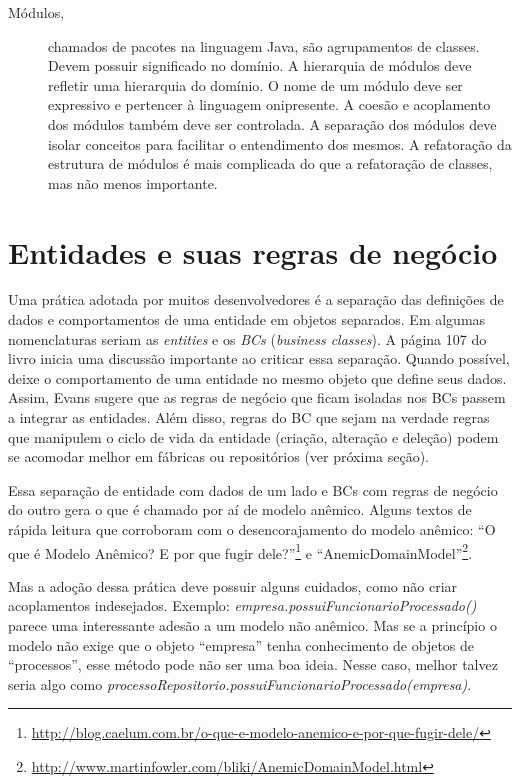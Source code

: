 \documentclass[a4paper, 12pt]{article}
\begin{document}
\begin{description}
\item [Módulos,] chamados de pacotes na linguagem Java, são agrupamentos de classes. Devem possuir significado no domínio. A hierarquia de módulos deve refletir uma hierarquia do domínio. O nome de um módulo deve ser expressivo e pertencer à linguagem onipresente. A coesão e acoplamento dos módulos também deve ser controlada. A separação dos módulos deve isolar conceitos para facilitar o entendimento dos mesmos. A refatoração da estrutura de módulos é mais complicada do que a refatoração de classes, mas não menos importante.

\end{description}

\section{Entidades e suas regras de negócio}

Uma prática adotada por muitos desenvolvedores é a separação das definições de dados e comportamentos de uma entidade em objetos separados. Em algumas nomenclaturas seriam as \emph{entities} e os \emph{BCs} (\emph{business classes}). A página 107 do livro inicia uma discussão importante ao criticar essa separação. Quando possível, deixe o comportamento de uma entidade no mesmo objeto que define seus dados. Assim, Evans sugere que as regras de negócio que ficam isoladas nos BCs passem a integrar as entidades. Além disso, regras do BC que sejam na verdade regras que manipulem o ciclo de vida da entidade (criação, alteração e deleção) podem se acomodar melhor em fábricas ou repositórios (ver próxima seção).

Essa separação de entidade com dados de um lado e BCs com regras de negócio do outro gera o que é chamado por aí de modelo anêmico. Alguns textos de rápida leitura que corroboram com o desencorajamento do modelo anêmico:  ``O que é Modelo Anêmico? E por que fugir dele?''\footnote{\url{http://blog.caelum.com.br/o-que-e-modelo-anemico-e-por-que-fugir-dele/}} e ``AnemicDomainModel''\footnote{\url{http://www.martinfowler.com/bliki/AnemicDomainModel.html}}.

Mas a adoção dessa prática deve possuir alguns cuidados, como não criar acoplamentos indesejados. Exemplo: \emph{empresa.possuiFuncionarioProcessado()} parece uma interessante adesão a um modelo não anêmico. Mas se a princípio o modelo não exige que o objeto ``empresa'' tenha conhecimento de objetos de ``processos'', esse método pode não ser uma boa ideia. Nesse caso, melhor talvez seria algo como \emph{processoRepositorio.possuiFuncionarioProcessado(empresa)}.
\end{document}
